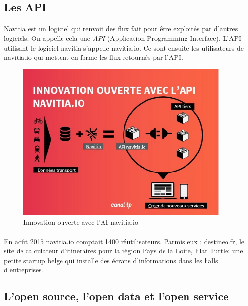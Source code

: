 \documentclass[a4paper]{report}
\begin{document}
\subsection{Les API} 
\paragraph{} Navitia est un logiciel qui renvoit des flux fait pour être exploités par d'autres logiciels. On appelle cela une  \emph{API} (Application Programming Interface). L'API utilisant le logiciel navitia s'appelle navitia.io. Ce sont ensuite les utilisateurs de navitia.io qui mettent en forme les flux retournés par l'API. 

\begin{figure}[H] 
	\begin{center}
		\includegraphics[width=300pt]{image/API_navitia}
		\caption{Innovation ouverte avec l'AI navitia.io}
		\label{Innovation ouverte avec l'AI navitia.io}
	\end{center}
\end{figure}

\paragraph{} En août 2016 navitia.io comptait 1400 réutilisateurs. Parmis eux : destineo.fr, le site de calculateur d'itinéraires pour la région Pays de la Loire, Flat Turtle: une petite startup belge qui installe des écrans d’informations dans les halls d’entreprises. 

\subsection{L'open source, l'open data et l'open service}
\end{document}

